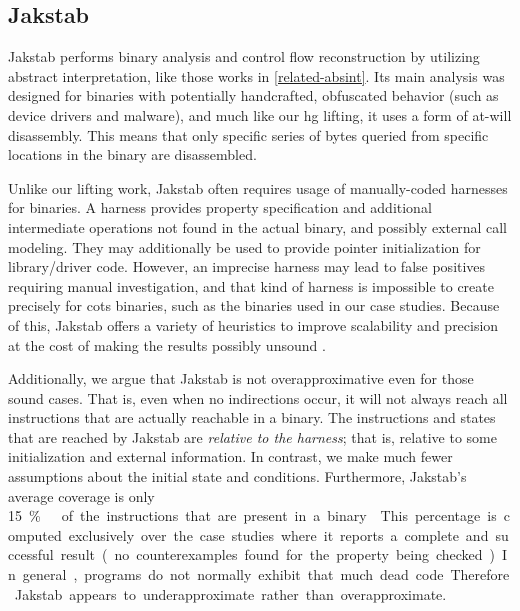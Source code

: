 
\subsection{Jakstab}\label{related-jakstab}
Jakstab performs binary analysis and control flow reconstruction by utilizing abstract interpretation, like those works in \cref{related-absint}.
Its main analysis was designed for binaries with potentially handcrafted, obfuscated behavior (such as device drivers and malware),
and much like our \ac{hg} lifting, it uses a form of at-will disassembly.
This means that only specific series of bytes queried from specific locations in the binary are disassembled.

Unlike our lifting work, Jakstab often requires usage of manually-coded harnesses for binaries.
A harness provides property specification and additional intermediate operations not found in the actual binary, and possibly external call modeling.
They may additionally be used to provide pointer initialization for library/driver code.
However, an imprecise harness may lead to false positives requiring manual investigation, and that kind of harness is impossible to create precisely for \ac{cots} binaries, such as the binaries used in our case studies.
Because of this, Jakstab offers a variety of heuristics to improve scalability and precision at the cost of making the results possibly unsound  \autocite[129]{kinder2010static}.

Additionally, we argue that Jakstab is not overapproximative even for those sound cases.
That is, even when no indirections occur, it will not always reach all instructions that are actually reachable in a binary.
The instructions and states that are reached by Jakstab
are \emph{relative to the harness}; that is, relative to some initialization
and external information.
In contrast, we make much fewer assumptions about the initial state and conditions.
Furthermore, Jakstab's average coverage is only \SI{15}\percent\ of the instructions that are present in a binary \autocite[Table~6.2]{kinder2010static}.
This percentage is computed exclusively over the case studies where it reports a complete and successful result (no counterexamples found for the property being checked).
In general, programs do not normally exhibit that much dead code.
Therefore Jakstab appears to underapproximate rather than overapproximate.

